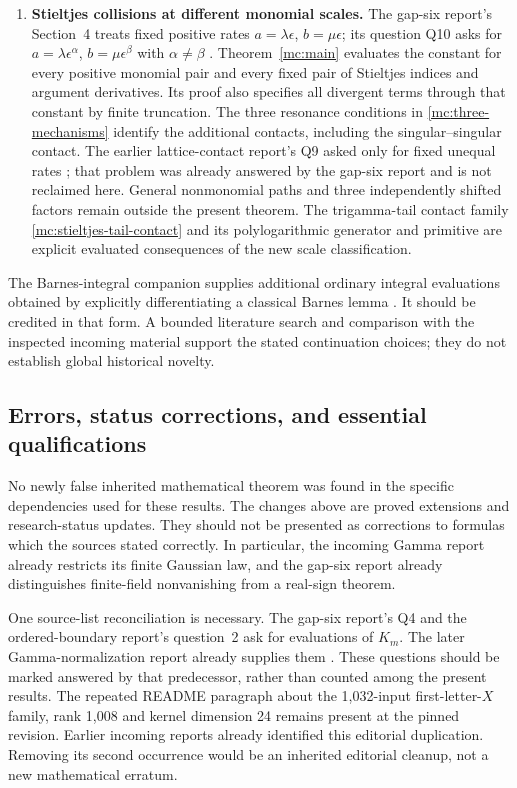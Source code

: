 \begin{enumerate}
\item \textbf{Stieltjes collisions at different monomial scales.}
The gap-six report's Section~4 treats fixed positive rates
$a=\lambda\epsilon$, $b=\mu\epsilon$; its question Q10 asks for
$a=\lambda\epsilon^\alpha$, $b=\mu\epsilon^\beta$ with
$\alpha\ne\beta$ \cite{GapSix}.
Theorem~\ref{mc:main} evaluates the constant for every positive
monomial pair and every fixed pair of Stieltjes indices and
argument derivatives. Its proof also specifies all divergent
terms through that constant by finite truncation. The three
resonance conditions in \eqref{mc:three-mechanisms} identify the
additional contacts, including the singular--singular contact.
The earlier lattice-contact report's Q9 asked only for fixed
unequal rates \cite{LatticeIncoming}; that problem was already
answered by the gap-six report and is not reclaimed here.
General nonmonomial paths and three independently shifted factors
remain outside the present theorem. The trigamma-tail contact
family \eqref{mc:stieltjes-tail-contact} and its polylogarithmic
generator and primitive are explicit evaluated consequences of
the new scale classification.
\end{enumerate}

The Barnes-integral companion supplies additional ordinary integral
evaluations obtained by explicitly differentiating a classical Barnes
lemma \cite{DLMF}. It should be credited in that form. A bounded
literature search and comparison with the inspected incoming material
support the stated continuation choices; they do not establish global
historical novelty.

\subsection{Errors, status corrections, and essential qualifications}

No newly false inherited mathematical theorem was found in the
specific dependencies used for these results. The changes above are
proved extensions and research-status updates. They should not be
presented as corrections to formulas which the sources stated correctly.
In particular, the incoming Gamma report already restricts its finite
Gaussian law, and the gap-six report already distinguishes finite-field
nonvanishing from a real-sign theorem.

One source-list reconciliation is necessary. The gap-six report's Q4
and the ordered-boundary report's question~2 ask for evaluations of
$K_m$. The later Gamma-normalization report already supplies them
\cite{GammaIncoming,GapSix,OrderedIncoming}. These questions should be
marked answered by that predecessor, rather than counted among the
present results. The repeated README paragraph about the 1,032-input
first-letter-$X$ family, rank 1,008 and kernel dimension 24 remains
present at the pinned revision. Earlier incoming reports already
identified this editorial duplication. Removing its second occurrence
would be an inherited editorial cleanup, not a new mathematical erratum.

